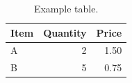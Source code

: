 \begin{table}[htbp]
  \centering
  \caption{Example table.}
  \label{tab:example}
  \begin{tabular}{lrr}
    \toprule
    Item & Quantity & Price \\
    \midrule
    A    & 2        & 1.50  \\
    B    & 5        & 0.75  \\
    \bottomrule
  \end{tabular}
\end{table}

